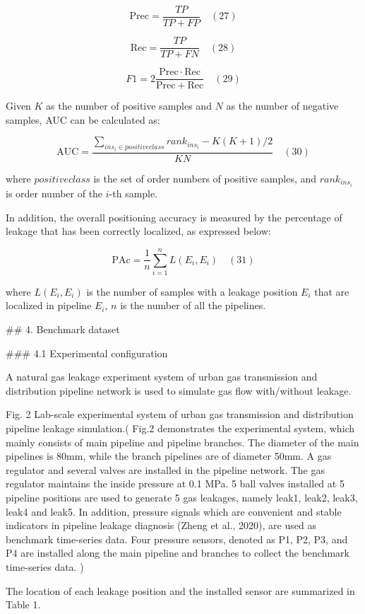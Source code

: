 $$
\mathrm{Prec} = \frac{TP}{TP + FP} \quad (27)
$$

$$
\mathrm{Rec} = \frac{TP}{TP + FN} \quad (28)
$$

$$
F1 = 2 \frac{\mathrm{Prec} \cdot \mathrm{Rec}}{\mathrm{Prec} + \mathrm{Rec}} \quad (29)
$$

Given $K$ as the number of positive samples and $N$ as the number of negative samples, AUC can be calculated as:

$$
\mathrm{AUC} = \frac{\sum_{ins_i \in positiveclass} rank_{ins_i} - K(K+1)/2}{KN} \quad (30)
$$

where $positiveclass$ is the set of order numbers of positive samples, and $rank_{ins_i}$ is order number of the $i$-th sample.

In addition, the overall positioning accuracy is measured by the percentage of leakage that has been correctly localized, as expressed below:

$$
\mathrm{PAc} = \frac{1}{n} \sum_{i=1}^n L(E_i,E_i) \quad (31)
$$

where $L(E_i,E_i)$ is the number of samples with a leakage position $E_i$ that are localized in pipeline $E_i$, $n$ is the number of all the pipelines.

## 4. Benchmark dataset

### 4.1 Experimental configuration

A natural gas leakage experiment system of urban gas transmission and distribution pipeline network is used to simulate gas flow with/without leakage.

Fig. 2 Lab-scale experimental system of urban gas transmission and distribution pipeline leakage simulation.(
Fig.2 demonstrates the experimental system, which mainly consists of main pipeline and pipeline branches. The diameter of the main pipelines is 80mm, while the branch pipelines are of diameter 50mm. A gas regulator and several valves are installed in the pipeline network. The gas regulator maintains the inside pressure at 0.1 MPa. 5 ball valves installed at 5 pipeline positions are used to generate 5 gas leakages, namely leak1, leak2, leak3, leak4 and leak5. In addition, pressure signals which are convenient and stable indicators in pipeline leakage diagnosis (Zheng et al., 2020), are used as benchmark time-series data. Four pressure sensors, denoted as P1, P2, P3, and P4 are installed along the main pipeline and branches to collect the benchmark time-series data.
)

The location of each leakage position and the installed sensor are summarized in Table 1.

